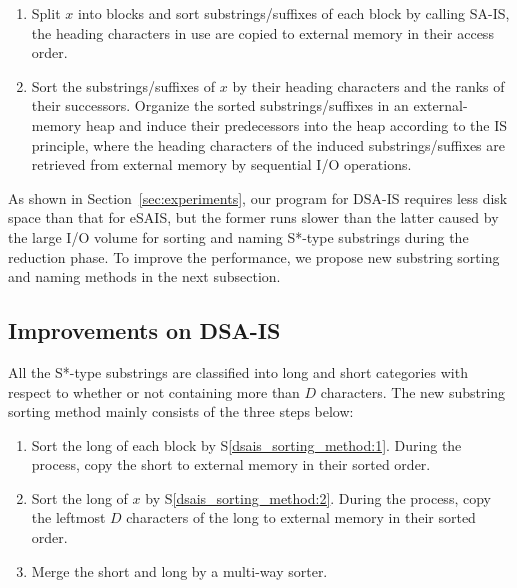\documentclass[10pt,journal,compsoc]{IEEEtran}
\begin{document}
\begin{enumerate}[S1]
	\item Split $x$ into blocks and sort substrings/suffixes of each block by calling SA-IS, the heading characters in use are copied to external memory in their access order. \label{dsais_sorting_method:1}
	\item Sort the substrings/suffixes of $x$ by their heading characters and the ranks of their successors. Organize the sorted substrings/suffixes in an external-memory heap and induce their predecessors into the heap according to the IS principle, where the heading characters of the induced substrings/suffixes are retrieved from external memory by sequential I/O operations.\label{dsais_sorting_method:2}
\end{enumerate}

As shown in Section~\ref{sec:experiments}, our program for DSA-IS requires less disk space than that for eSAIS, but the former runs slower than the latter caused by the large I/O volume for sorting and naming S*-type substrings during the reduction phase. To improve the performance, we propose new substring sorting and naming methods in the next subsection.

\subsection{Improvements on DSA-IS}

All the S*-type substrings are classified into long and short categories with respect to whether or not containing more than $D$ characters. The new substring sorting method mainly consists of the three steps below:

\begin{enumerate}[S1']
	\item Sort the long of each block by S\ref{dsais_sorting_method:1}. During the process, copy the short to external memory in their sorted order.~\label{dsaism_sorting_method:1}
	
	\item Sort the long of $x$ by S\ref{dsais_sorting_method:2}. During the process, copy the leftmost $D$ characters of the long to external memory in their sorted order.~\label{dsaism_sorting_method:2}
	
	\item Merge the short and long by a multi-way sorter.~\label{dsaism_sorting_method:3}
\end{enumerate}
\end{document}
